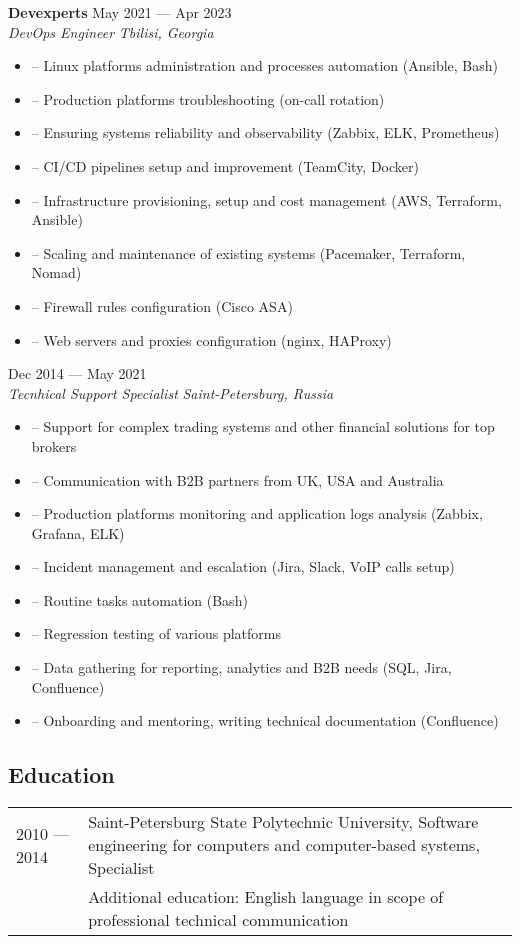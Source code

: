 \documentclass[10pt]{report}
\newenvironment{JobDescription}[5]{
    \vspace{ #5 }
    \flushleft
    {\bf #1 } \hfill { #2 }
    \\
    {\em #3 } \hfill {\em #4 }
    \begin{itemize}
} {
    \end{itemize}
}
\begin{document}
\begin{JobDescription}{Devexperts}{May 2021 --- Apr 2023}{DevOps Engineer}{Tbilisi, Georgia}{0mm}
  \item[--] Linux platforms administration and processes automation (Ansible, Bash)
  \item[--] Production platforms troubleshooting (on-call rotation)
  \item[--] Ensuring systems reliability and observability (Zabbix, ELK, Prometheus)
  \item[--] CI/CD pipelines setup and improvement (TeamCity, Docker)
  \item[--] Infrastructure provisioning, setup and cost management (AWS, Terraform, Ansible)
  \item[--] Scaling and maintenance of existing systems (Pacemaker, Terraform, Nomad)
  \item[--] Firewall rules configuration (Cisco ASA)
  \item[--] Web servers and proxies configuration (nginx, HAProxy)
\end{JobDescription}

\begin{JobDescription}{}{Dec 2014 --- May 2021}{Tecnhical Support Specialist}{Saint-Petersburg, Russia}{0mm}
  \item[--] Support for complex trading systems and other financial solutions for top brokers
  \item[--] Communication with B2B partners from UK, USA and Australia
  \item[--] Production platforms monitoring and application logs analysis (Zabbix, Grafana, ELK)
  \item[--] Incident management and escalation (Jira, Slack, VoIP calls setup)
  \item[--] Routine tasks automation (Bash)
  \item[--] Regression testing of various platforms
  \item[--] Data gathering for reporting, analytics and B2B needs (SQL, Jira, Confluence)
  \item[--] Onboarding and mentoring, writing technical documentation (Confluence)
\end{JobDescription}

\goodbreak

\subsection*{Education}
\begin{table}[H]
  \begin{tabular}{@{}p{}p{}}
    2010 --- 2014 & Saint-Petersburg State Polytechnic University, Software engineering for computers and computer-based systems, Specialist \\
                  & Additional education: English language in scope of professional technical communication
  \end{tabular}
\end{table}
\end{document}
